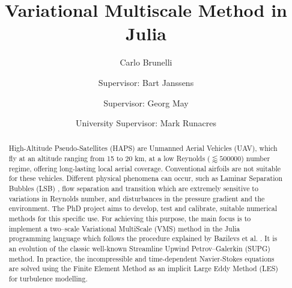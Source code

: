 \documentclass[final,authoryear,3p,times,twocolumn]{vki_phd}
\begin{document}
\begin{frontmatter}


%
%
%
%


\title{Variational Multiscale Method in Julia}
\author{Carlo Brunelli}
\address{Aeronautics and Aerospace Department, von Karman Institute for Fluid Dynamics, Belgium, carlo.brunelli@mil.be}
\author{Supervisor: Bart Janssens}
\address{Associate Professor, Mechanical Engineering Department, Royal Military Academy, Belgium, Bart.Janssens@mil.be}
\author{Supervisor: Georg May}
\address{Associate Professor, Aeronautics and Aerospace Department, von Karman Institute for Fluid Dynamics, Belgium, georg.may@vki.ac.be}
\author{University Supervisor: Mark Runacres}
\address{Professor, Engineering Technology Thermodynamics and Fluid Mechanics Group, VUB, Belgium, mark.runacres@vub.be}

\begin{abstract}
High-Altitude Pseudo-Satellites (HAPS) are Unmanned Aerial Vehicles (UAV), which fly at an altitude ranging from 15 to 20 km, at a low Reynolds ($\lessapprox 500000$) number regime, offering long-lasting local aerial coverage. Conventional airfoils are not suitable for these vehicles. Different physical phenomena can occur, such as Laminar Separation Bubbles (LSB) \cite{Selig1997HighLiftLR, Abhijit13, OMeara87}, flow separation and transition which are extremely sensitive to variations in
Reynolds number, and disturbances in the pressure gradient and the environment. 
The PhD project aims to develop, test and calibrate, suitable numerical methods for this specific use. For achieving this purpose, the main focus is to implement a two–scale Variational MultiScale (VMS) method in the Julia programming language which follows the procedure explained by Bazilevs et al. \cite{Bazilevs2007}. It is an evolution of the classic well-known Streamline Upwind Petrov–Galerkin (SUPG) method. In practice, the incompressible and time-dependent Navier-Stokes equations are solved using the Finite Element Method as an implicit Large Eddy Method (LES) for turbulence modelling. 


\end{abstract}
\end{frontmatter}
\end{document}
